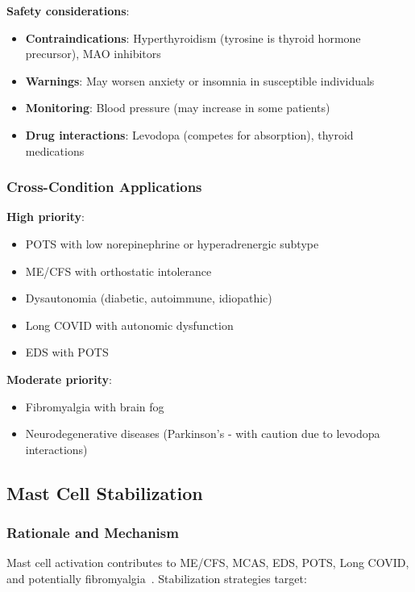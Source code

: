 \textbf{Safety considerations}:
\begin{itemize}
    \item \textbf{Contraindications}: Hyperthyroidism (tyrosine is thyroid hormone precursor), MAO inhibitors
    \item \textbf{Warnings}: May worsen anxiety or insomnia in susceptible individuals
    \item \textbf{Monitoring}: Blood pressure (may increase in some patients)
    \item \textbf{Drug interactions}: Levodopa (competes for absorption), thyroid medications
\end{itemize}

\subsubsection{Cross-Condition Applications}

\textbf{High priority}:
\begin{itemize}
    \item POTS with low norepinephrine or hyperadrenergic subtype
    \item ME/CFS with orthostatic intolerance
    \item Dysautonomia (diabetic, autoimmune, idiopathic)
    \item Long COVID with autonomic dysfunction
    \item EDS with POTS
\end{itemize}

\textbf{Moderate priority}:
\begin{itemize}
    \item Fibromyalgia with brain fog
    \item Neurodegenerative diseases (Parkinson's - with caution due to levodopa interactions)
\end{itemize}

\subsection{Mast Cell Stabilization}
\label{sec:mast-cell-stabilization}

\subsubsection{Rationale and Mechanism}

Mast cell activation contributes to ME/CFS, MCAS, EDS, POTS, Long COVID, and potentially fibromyalgia~\cite{Wirth2023,Afrin2016}. Stabilization strategies target:

